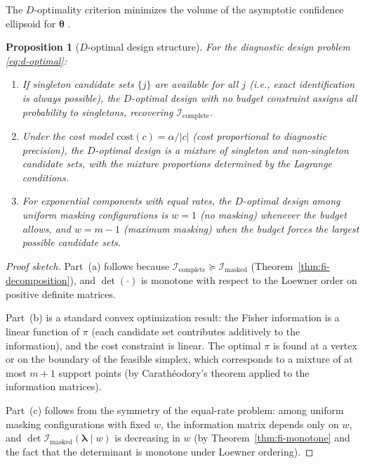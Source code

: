 \documentclass[11pt]{article}
\theoremstyle{definition}
\theoremstyle{plain}
\newtheorem{proposition}{Proposition}
\renewcommand{\v}[1]{\boldsymbol{#1}}
\newcommand{\btheta}{\v{\theta}}
\newcommand{\FI}{\mathcal{I}}       %
\begin{document}
The $D$-optimality criterion minimizes the volume of the asymptotic
confidence ellipsoid for $\btheta$
\citep{atkinson2007,pukelsheim2006}.

\begin{proposition}[$D$-optimal design structure]
\label{prop:d-optimal-structure}
For the diagnostic design problem \eqref{eq:d-optimal}:
\begin{enumerate}[label=(\alph*)]
    \item If singleton candidate sets $\{j\}$ are available for all
    $j$ (i.e., exact identification is always possible), the
    $D$-optimal design with no budget constraint assigns all
    probability to singletons, recovering $\FI_{\mathrm{complete}}$.
    \item Under the cost model
    $\text{cost}(c) = \alpha / |c|$ (cost proportional to diagnostic
    precision), the $D$-optimal design is a mixture of singleton and
    non-singleton candidate sets, with the mixture proportions
    determined by the Lagrange conditions.
    \item For exponential components with equal rates, the $D$-optimal
    design among uniform masking configurations is $w = 1$ (no masking)
    whenever the budget allows, and $w = m - 1$ (maximum masking)
    when the budget forces the largest possible candidate sets.
\end{enumerate}
\end{proposition}

\begin{proof}[Proof sketch]
Part~(a) follows because $\FI_{\mathrm{complete}} \succeq
\FI_{\mathrm{masked}}$ (Theorem~\ref{thm:fi-decomposition}), and
$\det(\cdot)$ is monotone with respect to the Loewner order on
positive definite matrices.

Part~(b) is a standard convex optimization result: the Fisher
information is a linear function of $\pi$ (each candidate set
contributes additively to the information), and the cost constraint
is linear.
The optimal $\pi$ is found at a vertex or on the boundary of the
feasible simplex, which corresponds to a mixture of at most $m + 1$
support points (by Carath\'eodory's theorem applied to the information
matrices).

Part~(c) follows from the symmetry of the equal-rate problem:
among uniform masking configurations with fixed $w$, the information
matrix depends only on $w$, and
$\det \FI_{\mathrm{masked}}(\v{\lambda} \mid w)$ is decreasing
in $w$ (by Theorem~\ref{thm:fi-monotone} and the fact that the
determinant is monotone under Loewner ordering).
\end{proof}
\end{document}
